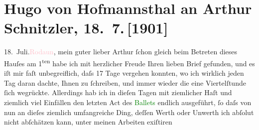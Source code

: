 

               \section[Hugo von Hofmannsthal an Arthur Schnitzler, 18. 7. {[}1901{]}]{ Hugo von Hofmannsthal an Arthur Schnitzler, 18. 7. {[}1901{]}}\nopagebreak{}\rehead{ }\normalsize\beginnumbering{} \toendnotes[C]{\smallbreak\pagebreak[2]} 
\toendnotes[C]{\smallbreak}\pstart
           \raggedleft{}{\pb}18. Juli.\hspace*{1.5em}\textcolor{pink}{Rodaun}{}\ledrightnote{\textcolor{pink}{Rodaun}},\pend
           \pstart{}mein guter lieber Arthur\pend\pstart
           ſchon gleich beim Betreten dieses Hauſes am 1\textsuperscript{ten}\label{K_L01149_1v}\label{K_L01149_1h} habe ich mit herzlicher Freude Ihren lieben Brief gefunden, und es iſt mir
               faſt unbegreiflich, daſs 17 Tage vergehen konnten, wo ich wirklich jeden Tag daran
               dachte, Ihnen zu ſchreiben, und immer wieder die eine Viertelſtunde ſich wegrückte.
               Allerdings hab ich in dieſen Tagen mit ziemlicher Haſt und ziemlich viel Einfällen
               den letzten Act des \textcolor{green}{Ballets}{}
               endlich ausgeführt, ſo daſs von nun an dieſes ziemlich umfangreiche Ding, deſſen
               Werth oder Unwerth ich abſolut nicht abſchätzen kann, unter meinen Arbeiten exiſtiren
